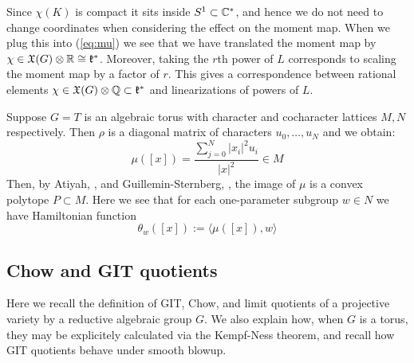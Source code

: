 Since \(\chi(K)\) is compact it sits inside \(S^1 \subset \mathbb{C}^*\), and hence we do not need to change coordinates when considering the effect on the moment map. When we plug this into (\ref{eq:mu}) we see that we have translated the moment map by \(\chi \in \mathfrak{X}(G) \otimes \mathbb{R} \cong \mathfrak{k}^*\). Moreover, taking the \(r\)th power of \(L\) corresponds to scaling the moment map by a factor of \(r\). This gives a correspondence between rational elements \(\chi \in \mathfrak{X}(G) \otimes \mathbb{Q} \subset \mathfrak{k}^*\) and linearizations of powers of \(L\).
\begin{example}
Suppose \(G = T\) is an algebraic torus with character and cocharacter lattices \(M,N\) respectively. Then \(\rho\) is a diagonal matrix of characters \(u_0,\dots,u_{N}\) and we obtain:
\[
\mu([x]) = \frac{\sum_{j=0}^N |x_i|^2 u_i}{|x|^2} \in M
\]
Then, by Atiyah, \cite{atiyah1982convexity}, and Guillemin-Sternberg, \cite{guillemin1982convexity}, the image of \(\mu\) is a convex polytope \(P \subset M\). Here we see that for each one-parameter subgroup \(w \in N\) we have Hamiltonian function
\[
\theta_w([x]) := \langle \mu([x]), w \rangle  
\]
\end{example}
\subsection{Chow and GIT quotients} \label{basics:Chowquotients}
Here we recall the definition of GIT, Chow, and limit quotients of a projective variety by a reductive algebraic group \(G\). We also explain how, when \(G\) is a torus, they may be explicitely calculated via the Kempf-Ness theorem, and recall how GIT quotients behave under smooth blowup.
